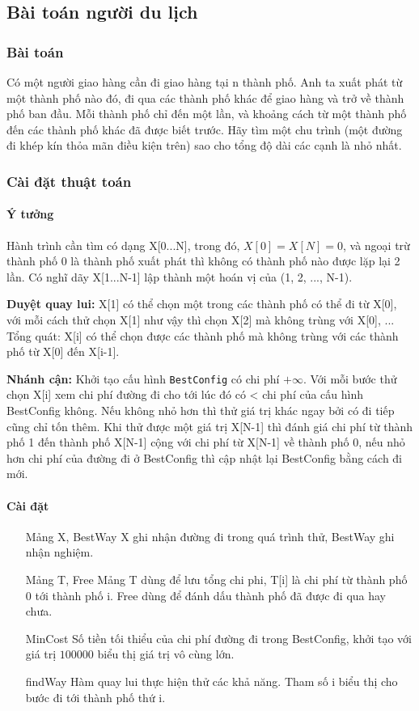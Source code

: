 \documentclass[a4paper,12pt]{report}
\begin{document}
\subsection{Bài toán người du lịch}

\subsubsection{Bài toán}
Có một người giao hàng cần đi giao hàng tại n thành phố. Anh ta xuất phát từ một thành phố nào đó, đi qua các thành phố khác để giao hàng và trở về thành phố ban đầu. Mỗi thành phố chỉ đến một lần, và khoảng cách từ một thành phố đến các thành phố khác đã được biết trước. Hãy tìm một chu trình (một đường đi khép kín thỏa mãn điều kiện trên) sao cho tổng độ dài các cạnh là nhỏ nhất.

\subsubsection{Cài đặt thuật toán}
\paragraph{Ý tưởng}

Hành trình cần tìm có dạng X[0...N], trong đó, $X[0] = X[N] = 0$, và ngoại trừ thành phố 0 là thành phố xuất phát thì không có thành phố nào được lặp lại 2 lần. Có nghĩ dãy X[1...N-1] lập thành một hoán vị của (1, 2, ..., N-1).

\textbf{Duyệt quay lui: } X[1] có thể chọn một trong các thành phố có thể đi từ X[0], với mỗi cách thử chọn X[1] như vậy thì chọn X[2] mà không trùng với X[0], ... Tổng quát: X[i] có thể chọn được các thành phố mà không trùng với các thành phố từ X[0] đến X[i-1].

\textbf{Nhánh cận:} Khởi tạo cấu hình \texttt{BestConfig} có chi phí $ +\infty $. Với mỗi bước thử chọn X[i] xem chi phí đường đi cho tới lúc đó có < chi phí của cấu hình BestConfig không. Nếu không nhỏ hơn thì thử giá trị khác ngay bởi có đi tiếp cũng chỉ tốn thêm. Khi thử được một giá trị X[N-1] thì đánh giá chi phí từ thành phố 1 đến thành phố X[N-1] cộng với chi phí từ X[N-1] về thành phố 0, nếu nhỏ hơn chi phí của đường đi ở BestConfig thì cập nhật lại BestConfig bằng cách đi mới.

\paragraph{Cài đặt}
\begin{itemize}
\item [Mảng X, BestWay] X ghi nhận đường đi trong quá trình thử, BestWay ghi nhận nghiệm.
\item [Mảng T, Free] Mảng T dùng để lưu tổng chi phi, T[i] là chi phí từ thành phố 0 tới thành phố i. Free dùng để đánh dấu thành phố đã được đi qua hay chưa.
\item [MinCost] Số tiền tối thiểu của chi phí đường đi trong BestConfig, khởi tạo với giá trị $100000$ biểu thị giá trị vô cùng lớn.
\item [findWay] Hàm quay lui thực hiện thử các khả năng. Tham số i biểu thị cho bước đi tới thành phố thứ i.
\end{itemize}
\end{document}
